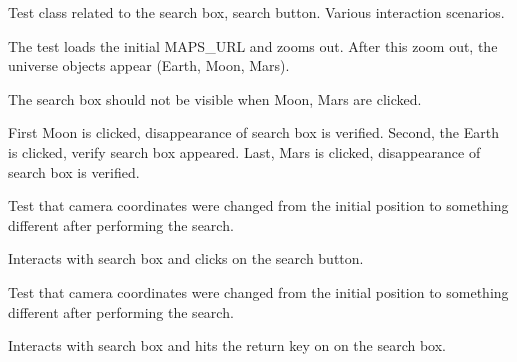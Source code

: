 \documentclass[letterpaper,10pt,english]{sphinxmanual}
\begin{document}
\begin{fulllineitems}
\label{test_general:test_general.TestSearch}
Test class related to the search box, search button.
Various interaction scenarios.

\begin{fulllineitems}
\label{test_general:test_general.TestSearch.test_no_searchbox_on_other_planets}
The test loads the initial MAPS\_URL and zooms out. After this zoom
out, the universe objects appear (Earth, Moon, Mars).

The search box should not be visible when Moon, Mars are clicked.

First Moon is clicked, disappearance of search box is verified.
Second, the Earth is clicked, verify search box appeared.
Last, Mars is clicked, disappearance of search box is verified.

\end{fulllineitems}


\begin{fulllineitems}
\label{test_general:test_general.TestSearch.test_search_clicking_search_button}
Test that camera coordinates were changed from the initial
position to something different after performing the search.

Interacts with search box and clicks on the search button.

\end{fulllineitems}


\begin{fulllineitems}
\label{test_general:test_general.TestSearch.test_search_hitting_return_on_search_box}
Test that camera coordinates were changed from the initial
position to something different after performing the search.

Interacts with search box and hits the return key on on the
search box.


\end{fulllineitems}
\end{fulllineitems}
\end{document}
